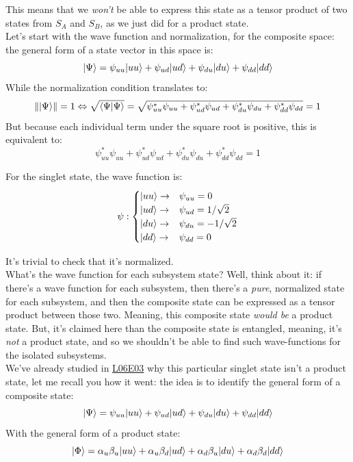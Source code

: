 \documentclass[solutions.tex]{subfiles}
\begin{document}
This means that we \textit{won't} be able to express this state
as a tensor product of two states from $S_A$ and $S_B$, as we just did
for a product state. \\

Let's start with the wave function and normalization, for the composite
space: the general form of a state vector in this space is:
\[
	|\Psi\rangle = \psi_{uu}|uu\rangle
		+ \psi_{ud}|ud\rangle
		+ \psi_{du}|du\rangle
		+ \psi_{dd}|dd\rangle
\]
While the normalization condition translates to:
\[
	\lVert |\Psi\rangle \rVert = 1 \Leftrightarrow \sqrt{\left\langle \Psi \middle| \Psi \right\rangle} =
	\sqrt{\psi_{uu}^*\psi_{uu}
		+\psi_{ud}^*\psi_{ud}
		+\psi_{du}^*\psi_{du}
		+\psi_{dd}^*\psi_{dd}
	} = 1
\]
But because each individual term under the square root is positive, this
is equivalent to:
\[
	\psi_{uu}^*\psi_{uu}
		+\psi_{ud}^*\psi_{ud}
		+\psi_{du}^*\psi_{du}
		+\psi_{dd}^*\psi_{dd}
	 = 1
\]

For the singlet state, the wave function is:
\[
	\psi : \begin{cases}
		|uu\rangle \rightarrow& \psi_{uu} = 0 \\
		|ud\rangle \rightarrow& \psi_{ud} = 1/\sqrt2 \\
		|du\rangle \rightarrow& \psi_{du} = -1/\sqrt2 \\
		|dd\rangle \rightarrow& \psi_{dd} = 0 \\
	\end{cases}
\]

It's trivial to check that it's normalized. \\

What's the wave function for each subsystem state? Well, think about
it: if there's a wave function for each subsystem, then there's a \textit{pure},
normalized state for each subsystem, and then the composite
state can be expressed as a tensor product between those two. Meaning,
this composite state \textit{would be} a product state. But, it's claimed
here than the composite state is entangled, meaning, it's \textit{not} a
product state, and so we shouldn't be able to find such wave-functions
for the isolated subsystems. \\

We've already studied in
\href{https://github.com/mbivert/ttm/blob/master/qm/L06E03.pdf}{L06E03} why
this particular singlet state isn't a product state, let me recall you how
it went: the idea is to identify the general form of a composite state:
\[
	|\Psi\rangle = \psi_{uu}|uu\rangle
		+ \psi_{ud}|ud\rangle
		+ \psi_{du}|du\rangle
		+ \psi_{dd}|dd\rangle
\]
With the general form of a product state:
\[
	|\Phi\rangle = \alpha_u\beta_u|uu\rangle
		+\alpha_u\beta_d|ud\rangle
		+\alpha_d\beta_u|du\rangle
		+\alpha_d\beta_d|dd\rangle
\]
\end{document}
